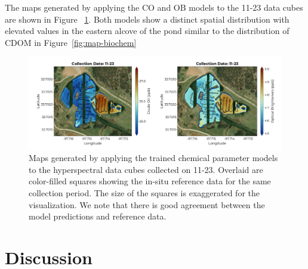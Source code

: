 \documentclass[sensors,article,submit,pdftex,moreauthors]{Definitions/mdpi}
\begin{document}
The maps generated by applying the CO and OB models to the 11-23 data cubes are shown in Figure ~\ref{fig:map-chem}. Both models show a distinct spatial distribution with elevated values in the eastern alcove of the pond similar to the distribution of CDOM in Figure~\ref{fig:map-biochem}

\begin{figure}
\centering
\includegraphics[width=\columnwidth]{paper/figures/results/maps/chemical.pdf}
\caption{Maps generated by applying the trained chemical parameter models to the hyperspectral data cubes collected on 11-23. Overlaid are color-filled squares showing the in-situ reference data for the same collection period. The size of the squares is exaggerated for the visualization. We note that there is good agreement between the model predictions and reference data.\label{fig:map-chem}}
\end{figure}  





\section{Discussion} \label{sec:discussion}
\end{document}
